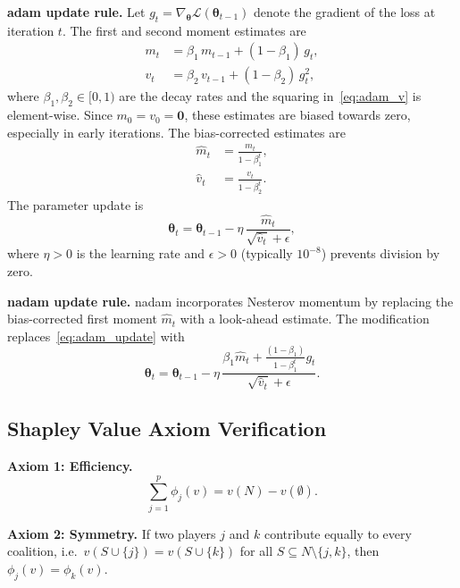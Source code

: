 \noindent\textbf{\Gls{adam} update rule.}
Let $g_t = \nabla_{\boldsymbol{\theta}} \mathcal{L}(\boldsymbol{\theta}_{t-1})$ denote the gradient of the loss at iteration $t$. The first and second moment estimates are
\begin{align}
  m_t &= \beta_1 \, m_{t-1} + (1 - \beta_1) \, g_t, \label{eq:adam_m} \\
  v_t &= \beta_2 \, v_{t-1} + (1 - \beta_2) \, g_t^2, \label{eq:adam_v}
\end{align}
where $\beta_1, \beta_2 \in [0, 1)$ are the decay rates and the squaring in~\eqref{eq:adam_v} is element-wise. Since $m_0 = v_0 = \mathbf{0}$, these estimates are biased towards zero, especially in early iterations. The bias-corrected estimates are
\begin{align}
  \hat{m}_t &= \frac{m_t}{1 - \beta_1^t}, \label{eq:adam_mhat} \\
  \hat{v}_t &= \frac{v_t}{1 - \beta_2^t}. \label{eq:adam_vhat}
\end{align}
The parameter update is
\begin{equation}
  \boldsymbol{\theta}_t = \boldsymbol{\theta}_{t-1} - \eta \, \frac{\hat{m}_t}{\sqrt{\hat{v}_t} + \epsilon},
  \label{eq:adam_update}
\end{equation}
where $\eta > 0$ is the learning rate and $\epsilon > 0$ (typically $10^{-8}$) prevents division by zero.

\noindent\textbf{\Gls{nadam} update rule.}
\Gls{nadam} incorporates Nesterov momentum by replacing the bias-corrected first moment $\hat{m}_t$ with a look-ahead estimate. The modification replaces~\eqref{eq:adam_update} with
\begin{equation}
  \boldsymbol{\theta}_t = \boldsymbol{\theta}_{t-1} - \eta \, \frac{\beta_1 \hat{m}_t + \frac{(1-\beta_1)}{1-\beta_1^t} g_t}{\sqrt{\hat{v}_t} + \epsilon}.
  \label{eq:nadam_update}
\end{equation}
\subsection{Shapley Value Axiom Verification}
\label{annexure:shapley_axioms}

\noindent\textbf{Axiom 1: Efficiency.}
\[
  \sum_{j=1}^{p} \phi_j(v) = v(N) - v(\emptyset).
\]

\noindent\textbf{Axiom 2: Symmetry.}
If two players $j$ and $k$ contribute equally to every coalition, i.e.\ $v(S \cup \{j\}) = v(S \cup \{k\})$ for all $S \subseteq N \setminus \{j,k\}$, then $\phi_j(v) = \phi_k(v)$.


